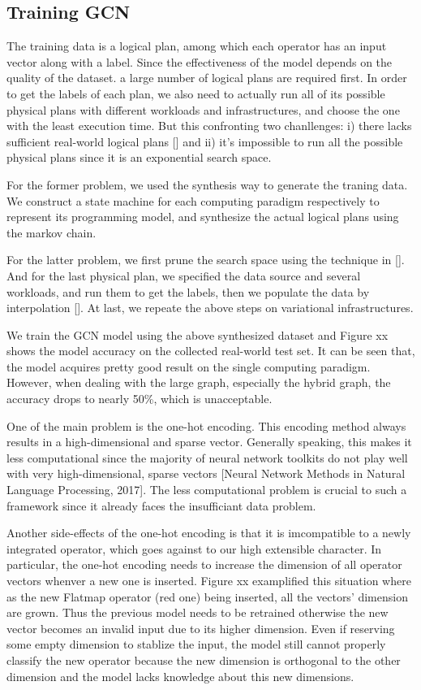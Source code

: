 \subsection{Training GCN}
The training data is a logical plan, among which each operator has an input vector along with a label.  
Since the effectiveness of the model depends on the quality of the dataset. 
a large number of logical plans are required first. 
In order to get the labels of each plan, we also need to actually run all of its possible physical plans with different workloads and infrastructures, and choose the one with the least execution time. 
But this confronting two chanllenges: 
i) there lacks sufficient real-world logical plans [] and 
ii) it's impossible to run all the possible physical plans since it is an exponential search space. 

For the former problem, we used the synthesis way to generate the traning data. 
We construct a state machine for each computing paradigm respectively to represent its programming model, and synthesize the actual logical plans using the markov chain. 

For the latter problem, we first prune the search space using the technique in []. 
And for the last physical plan, we specified the data source and several workloads, and run them to get the labels, then we populate the data by interpolation []. 
At last, we repeate the above steps on variational infrastructures.

We train the GCN model using the above synthesized dataset and Figure xx shows the model accuracy on the collected real-world test set. 
It can be seen that, the model acquires pretty good result on the single computing paradigm. 
However, when dealing with the large graph, especially the hybrid graph, the accuracy drops to nearly 50\%, which is unacceptable.

One of the main problem is the one-hot encoding. 
This encoding method always results in a high-dimensional and sparse vector. 
Generally speaking, this makes it less computational since the majority of neural network toolkits do not play well with very high-dimensional, sparse vectors [Neural Network Methods in Natural Language Processing, 2017]. 
The less computational problem is crucial to such a framework since it already faces the insufficiant data problem. 

Another side-effects of the one-hot encoding is that it is imcompatible to a newly integrated operator, which goes against to our high extensible character. 
In particular, the one-hot encoding needs to increase the dimension of all operator vectors whenver a new one is inserted. 
Figure xx examplified this situation where as the new Flatmap operator (red one) being inserted, all the vectors' dimension are grown. 
Thus the previous model needs to be retrained otherwise the new vector becomes an invalid input due to its higher dimension. 
Even if reserving some empty dimension to stablize the input, the model still cannot properly classify the new operator because the new dimension is orthogonal to the other dimension and the model lacks knowledge about this new dimensions.

